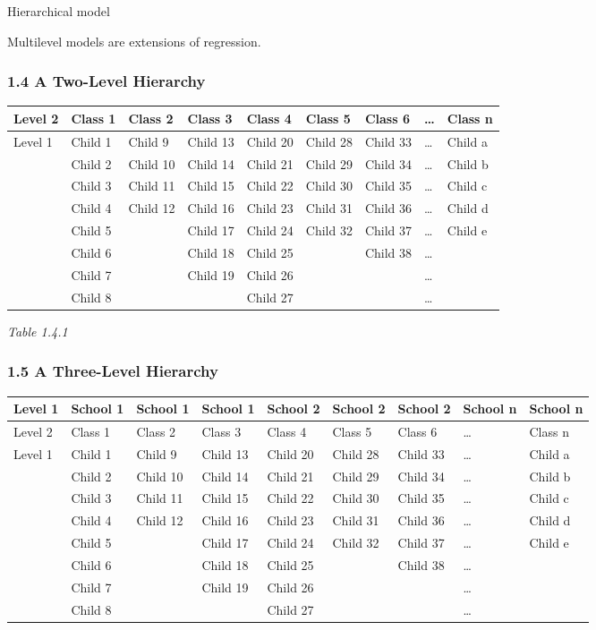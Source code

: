 \documentclass[
]{article}
\begin{document}
Hierarchical model

Multilevel models are extensions of regression.

\hypertarget{a-two-level-hierarchy}{%
\subsubsection{1.4 A Two-Level Hierarchy}\label{a-two-level-hierarchy}}

\begin{longtable}[]{@{}lllllllll@{}}
\toprule
Level 2 & Class 1 & Class 2 & Class 3 & Class 4 & Class 5 & Class 6 &
\ldots{} & Class n\tabularnewline
\midrule
\endhead
Level 1 & Child 1 & Child 9 & Child 13 & Child 20 & Child 28 & Child 33
& \ldots{} & Child a\tabularnewline
& Child 2 & Child 10 & Child 14 & Child 21 & Child 29 & Child 34 &
\ldots{} & Child b\tabularnewline
& Child 3 & Child 11 & Child 15 & Child 22 & Child 30 & Child 35 &
\ldots{} & Child c\tabularnewline
& Child 4 & Child 12 & Child 16 & Child 23 & Child 31 & Child 36 &
\ldots{} & Child d\tabularnewline
& Child 5 & & Child 17 & Child 24 & Child 32 & Child 37 & \ldots{} &
Child e\tabularnewline
& Child 6 & & Child 18 & Child 25 & & Child 38 & \ldots{}
&\tabularnewline
& Child 7 & & Child 19 & Child 26 & & & \ldots{} &\tabularnewline
& Child 8 & & & Child 27 & & & \ldots{} &\tabularnewline
\bottomrule
\end{longtable}

\emph{Table 1.4.1}

\hypertarget{a-three-level-hierarchy}{%
\subsubsection{1.5 A Three-Level
Hierarchy}\label{a-three-level-hierarchy}}

\begin{longtable}[]{@{}lllllllll@{}}
\toprule
Level 1 & School 1 & School 1 & School 1 & School 2 & School 2 & School
2 & School n & School n\tabularnewline
\midrule
\endhead
Level 2 & Class 1 & Class 2 & Class 3 & Class 4 & Class 5 & Class 6 &
\ldots{} & Class n\tabularnewline
Level 1 & Child 1 & Child 9 & Child 13 & Child 20 & Child 28 & Child 33
& \ldots{} & Child a\tabularnewline
& Child 2 & Child 10 & Child 14 & Child 21 & Child 29 & Child 34 &
\ldots{} & Child b\tabularnewline
& Child 3 & Child 11 & Child 15 & Child 22 & Child 30 & Child 35 &
\ldots{} & Child c\tabularnewline
& Child 4 & Child 12 & Child 16 & Child 23 & Child 31 & Child 36 &
\ldots{} & Child d\tabularnewline
& Child 5 & & Child 17 & Child 24 & Child 32 & Child 37 & \ldots{} &
Child e\tabularnewline
& Child 6 & & Child 18 & Child 25 & & Child 38 & \ldots{}
&\tabularnewline
& Child 7 & & Child 19 & Child 26 & & & \ldots{} &\tabularnewline
& Child 8 & & & Child 27 & & & \ldots{} &\tabularnewline
\bottomrule
\end{longtable}
\end{document}

